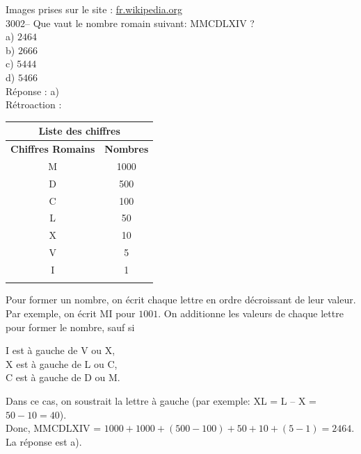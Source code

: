 \documentclass[letterpaper, 12pt]{article}
\begin{document}
Images prises sur le site : \href{http://fr.wikipedia.org}{fr.wikipedia.org}\\



3002-- Que vaut le nombre romain suivant: MMCDLXIV ?\\

a) $2464$\\
b) $2666$\\
c) $5444$\\
d) $5466$\\

R\'eponse : a)\\

R\'etroaction :\\
\begin{center}
\begin{tabular}{|c|c|}
\multicolumn{2}{c}{\bf Liste des chiffres}\\[2mm] \hline
{\bf Chiffres Romains} & {\bf Nombres} \\[1mm] \hline \hline
M & 1000 \\[1mm] \hline
D & 500 \\[1mm] \hline
C & 100 \\[1mm] \hline
L & 50 \\[1mm] \hline
X & 10 \\[1mm] \hline
V & 5 \\[1mm] \hline
I & 1 \\[1mm] \hline
\multicolumn{2}{c}{}\\
\end{tabular}
\end{center}
Pour former un nombre, on \'ecrit chaque lettre en ordre d\'ecroissant de leur valeur. Par exemple, on \'ecrit MI pour $1001$. On additionne les valeurs de chaque lettre pour former le nombre, sauf si
\begin{center}
I est \`a gauche de V ou X,\\
X est \`a gauche de L ou C,\\
C est \`a gauche de D ou M.\\
\end{center}
Dans ce cas, on soustrait la lettre \`a gauche (par exemple: XL = L -- X = $50 - 10 = 40$).\\

Donc, MMCDLXIV = $1000 + 1000 + (500 - 100) + 50 + 10 + (5 - 1) = 2464$. La r\'eponse est a).\\
\end{document}
